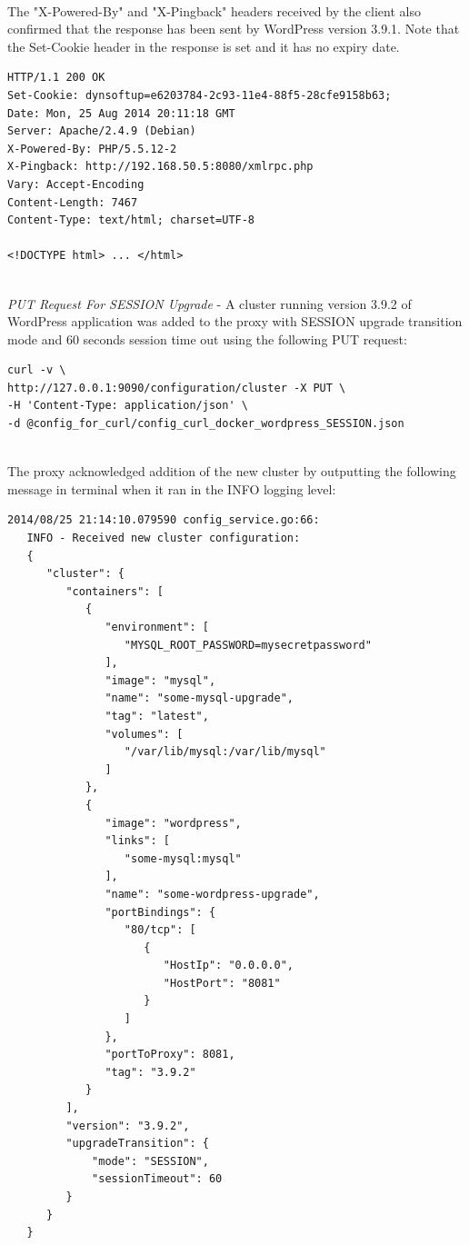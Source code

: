 \documentclass[a4paper,11pt,twoside]{report}
\begin{document}
\noindent\\
The "X-Powered-By" and "X-Pingback" headers received by the client also confirmed that the response has been sent by WordPress version 3.9.1.  Note that the Set-Cookie header in the response is set and it has no expiry date. \smallskip 

\begin{lstlisting}[language=terminal] 
HTTP/1.1 200 OK
Set-Cookie: dynsoftup=e6203784-2c93-11e4-88f5-28cfe9158b63;
Date: Mon, 25 Aug 2014 20:11:18 GMT
Server: Apache/2.4.9 (Debian)
X-Powered-By: PHP/5.5.12-2
X-Pingback: http://192.168.50.5:8080/xmlrpc.php
Vary: Accept-Encoding
Content-Length: 7467
Content-Type: text/html; charset=UTF-8

<!DOCTYPE html> ... </html>
\end{lstlisting} 

\noindent\\
\textit{PUT Request For SESSION Upgrade} - A cluster running version 3.9.2 of WordPress application was added to the proxy with SESSION upgrade transition mode and 60 seconds session time out using the following PUT request: \smallskip 

\begin{lstlisting}[language=terminal] 
curl -v \
http://127.0.0.1:9090/configuration/cluster -X PUT \
-H 'Content-Type: application/json' \ 
-d @config_for_curl/config_curl_docker_wordpress_SESSION.json
\end{lstlisting}

\noindent\\
The proxy acknowledged addition of the new cluster by outputting the following message in terminal when it ran in the INFO logging level: \smallskip 

\begin{lstlisting}[language=terminal] 
2014/08/25 21:14:10.079590 config_service.go:66:     
   INFO - Received new cluster configuration:
   {
      "cluster": {
         "containers": [
            {
               "environment": [
                  "MYSQL_ROOT_PASSWORD=mysecretpassword"
               ],
               "image": "mysql",
               "name": "some-mysql-upgrade",
               "tag": "latest",
               "volumes": [
                  "/var/lib/mysql:/var/lib/mysql"
               ]
            },
            {
               "image": "wordpress",
               "links": [
                  "some-mysql:mysql"
               ],
               "name": "some-wordpress-upgrade",
               "portBindings": {
                  "80/tcp": [
                     {
                        "HostIp": "0.0.0.0",
                        "HostPort": "8081"
                     }
                  ]
               },
               "portToProxy": 8081,
               "tag": "3.9.2"
            }
         ],
         "version": "3.9.2",
         "upgradeTransition": {
             "mode": "SESSION",
             "sessionTimeout": 60
         }
      }
   }
\end{lstlisting}   
\end{document}
